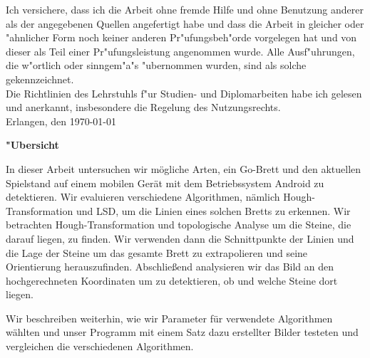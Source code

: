 \documentclass[english,bt]{package/lmedoc}
\begin{document}
\clearpage
  \begin{deckblatt}
  \end{deckblatt}


\cleardoublepage

Ich versichere, dass ich die Arbeit ohne fremde Hilfe und ohne Benutzung
anderer als der angegebenen Quellen angefertigt habe und dass die Arbeit
in gleicher oder "ahnlicher Form noch keiner anderen Pr"ufungsbeh"orde
vorgelegen hat und von dieser als Teil einer Pr"ufungsleistung
angenommen wurde. Alle Ausf"uhrungen, die w"ortlich oder sinngem"a"s
"ubernommen wurden, sind als solche gekennzeichnet.
\\

Die Richtlinien des Lehrstuhls f"ur Studien- und Diplomarbeiten
habe ich gelesen und anerkannt, insbesondere die Regelung des
Nutzungsrechts. \\[15mm]
Erlangen, den \today \hspace{6.0cm} \\[10mm]

\cleardoublepage

\begin{center}
\bfseries
"Ubersicht
\normalfont

In dieser Arbeit untersuchen wir mögliche Arten, ein Go-Brett und den aktuellen Spielstand auf einem mobilen Gerät mit dem Betriebssystem Android zu detektieren. Wir evaluieren verschiedene Algorithmen, nämlich Hough-Transformation und LSD, um die Linien eines solchen Bretts zu erkennen. Wir betrachten Hough-Transformation und topologische Analyse um die Steine, die darauf liegen, zu finden. Wir verwenden dann die Schnittpunkte der Linien und die Lage der Steine um das gesamte Brett zu extrapolieren und seine Orientierung herauszufinden. Abschließend analysieren wir das Bild an den hochgerechneten Koordinaten um zu detektieren, ob und welche Steine dort liegen.

Wir beschreiben weiterhin, wie wir Parameter für verwendete Algorithmen wählten und unser Programm mit einem Satz dazu erstellter Bilder testeten und vergleichen die verschiedenen Algorithmen.
\end{center}


\vspace{5.0cm}
\end{document}
